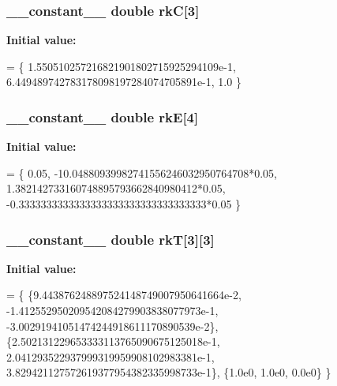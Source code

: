\subsubsection[{\texorpdfstring{rkC}{rkC}}]{\setlength{\rightskip}{0pt plus 5cm}\+\_\+\+\_\+constant\+\_\+\+\_\+ double rkC\mbox{[}3\mbox{]}}\hypertarget{radau2a_8cu_aad43fe540a71483ff469d059a7a2ae47}{}\label{radau2a_8cu_aad43fe540a71483ff469d059a7a2ae47}
{\bfseries Initial value\+:}
\begin{DoxyCode}
= \{
1.550510257216821901802715925294109e-1,
6.449489742783178098197284074705891e-1,
1.0
\}
\end{DoxyCode}
\subsubsection[{\texorpdfstring{rkE}{rkE}}]{\setlength{\rightskip}{0pt plus 5cm}\+\_\+\+\_\+constant\+\_\+\+\_\+ double rkE\mbox{[}4\mbox{]}}\hypertarget{radau2a_8cu_a737d65e39448a261886c48517d9bb0b0}{}\label{radau2a_8cu_a737d65e39448a261886c48517d9bb0b0}
{\bfseries Initial value\+:}
\begin{DoxyCode}
= \{
0.05,
-10.04880939982741556246032950764708*0.05,
1.382142733160748895793662840980412*0.05,
-0.3333333333333333333333333333333333*0.05
\}
\end{DoxyCode}
\subsubsection[{\texorpdfstring{rkT}{rkT}}]{\setlength{\rightskip}{0pt plus 5cm}\+\_\+\+\_\+constant\+\_\+\+\_\+ double rkT\mbox{[}3\mbox{]}\mbox{[}3\mbox{]}}\hypertarget{radau2a_8cu_a23863b2377430f09acb8523df5be7c3a}{}\label{radau2a_8cu_a23863b2377430f09acb8523df5be7c3a}
{\bfseries Initial value\+:}
\begin{DoxyCode}
= \{
\{9.443876248897524148749007950641664e-2,
-1.412552950209542084279903838077973e-1,
-3.00291941051474244918611170890539e-2\},
\{2.502131229653333113765090675125018e-1,
2.041293522937999319959908102983381e-1,
3.829421127572619377954382335998733e-1\},
\{1.0e0,
1.0e0,
0.0e0\}
\}
\end{DoxyCode}
